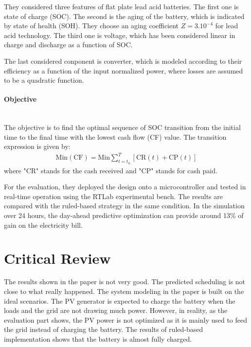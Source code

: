 \documentclass[11pt]{article}
\begin{document}
They considered three features of flat plate lead acid batteries. The first one is state of charge (SOC). The second is the aging of the battery, which is indicated by state of health (SOH). They choose an aging coefficient $Z = 3.10^{-4}$ for lead acid technology. The third one is voltage, which has been considered linear in charge and discharge as a function of SOC.

The last considered conponent is converter, which is modeled according to their efficiency as a function of the input normalized power, where losses are assumed to be a quadratic function.

\paragraph{Objective} \mbox{} \\
The objective is to find the optimal sequence of SOC transition from the initial time to the final time with the lowest cash flow (CF) value. The transition expression is given by:
\begin{gather*}
  \mathrm{Min(CF)} = \mathrm{Min} \sum_{t=t_0}^T [\mathrm{CR}(t) + \mathrm{CP}(t)]
\end{gather*}
where "CR" stands for the cash received and "CP" stands for cash paid.

For the evaluation, they deployed the design onto a microcontroller and tested in real-time operation using the RTLab experimental bench. The results are compared with the ruled-based strategy in the same condition. In the simulation over 24 hours, the day-ahead predictive optimization can provide around 13\% of gain on the electricity bill.

\section{Critical Review}
The results shown in the paper is not very good. The predicted scheduling is not close to what really happened. The system modeling in the paper is built on the ideal scenarios. The PV generator is expected to charge the battery when the loads and the grid are not drawing much power. However, in reality, as the evaluation part shows, the PV power is not optimized as it is mainly used to feed the grid instead of charging the battery. The results of ruled-based implementation shows that the battery is almost fully charged.
\end{document}
